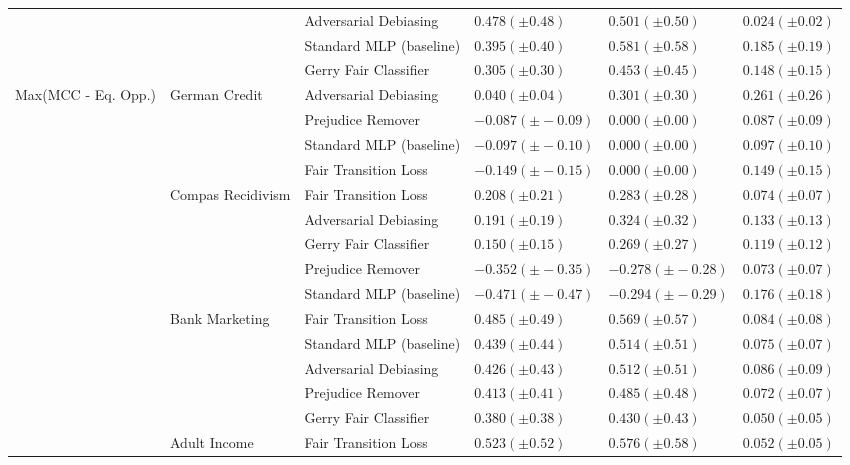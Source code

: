 \begin{tabular}{llllll}
 &  & Adversarial Debiasing & $0.478 (\pm0.48)$ & $0.501 (\pm0.50)$ & $0.024 (\pm0.02)$ \\
 &  & Standard MLP (baseline) & $0.395 (\pm0.40)$ & $0.581 (\pm0.58)$ & $0.185 (\pm0.19)$ \\
 &  & Gerry Fair Classifier & $0.305 (\pm0.30)$ & $0.453 (\pm0.45)$ & $0.148 (\pm0.15)$ \\
\cline{1-6} \cline{2-6}
\multirow[t]{19}{*}{Max(MCC - Eq. Opp.)} & \multirow[t]{4}{*}{German Credit} & Adversarial Debiasing & $0.040 (\pm0.04)$ & $0.301 (\pm0.30)$ & $0.261 (\pm0.26)$ \\
 &  & Prejudice Remover & $-0.087 (\pm-0.09)$ & $0.000 (\pm0.00)$ & $0.087 (\pm0.09)$ \\
 &  & Standard MLP (baseline) & $-0.097 (\pm-0.10)$ & $0.000 (\pm0.00)$ & $0.097 (\pm0.10)$ \\
 &  & Fair Transition Loss & $-0.149 (\pm-0.15)$ & $0.000 (\pm0.00)$ & $0.149 (\pm0.15)$ \\
\cline{2-6}
 & \multirow[t]{5}{*}{Compas Recidivism} & Fair Transition Loss & $0.208 (\pm0.21)$ & $0.283 (\pm0.28)$ & $0.074 (\pm0.07)$ \\
 &  & Adversarial Debiasing & $0.191 (\pm0.19)$ & $0.324 (\pm0.32)$ & $0.133 (\pm0.13)$ \\
 &  & Gerry Fair Classifier & $0.150 (\pm0.15)$ & $0.269 (\pm0.27)$ & $0.119 (\pm0.12)$ \\
 &  & Prejudice Remover & $-0.352 (\pm-0.35)$ & $-0.278 (\pm-0.28)$ & $0.073 (\pm0.07)$ \\
 &  & Standard MLP (baseline) & $-0.471 (\pm-0.47)$ & $-0.294 (\pm-0.29)$ & $0.176 (\pm0.18)$ \\
\cline{2-6}
 & \multirow[t]{5}{*}{Bank Marketing} & Fair Transition Loss & $0.485 (\pm0.49)$ & $0.569 (\pm0.57)$ & $0.084 (\pm0.08)$ \\
 &  & Standard MLP (baseline) & $0.439 (\pm0.44)$ & $0.514 (\pm0.51)$ & $0.075 (\pm0.07)$ \\
 &  & Adversarial Debiasing & $0.426 (\pm0.43)$ & $0.512 (\pm0.51)$ & $0.086 (\pm0.09)$ \\
 &  & Prejudice Remover & $0.413 (\pm0.41)$ & $0.485 (\pm0.48)$ & $0.072 (\pm0.07)$ \\
 &  & Gerry Fair Classifier & $0.380 (\pm0.38)$ & $0.430 (\pm0.43)$ & $0.050 (\pm0.05)$ \\
\cline{2-6}
 & \multirow[t]{5}{*}{Adult Income} & Fair Transition Loss & $0.523 (\pm0.52)$ & $0.576 (\pm0.58)$ & $0.052 (\pm0.05)$ \\

\end{tabular}
